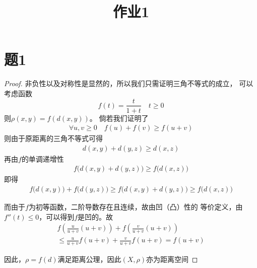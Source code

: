 \documentclass[cn]{homework}
\title{作业1}
\begin{document}
    \maketitle
    \section{题1}
    \begin{proof}
        非负性以及对称性是显然的，所以我们只需证明三角不等式的成立，
        可以考虑函数
        \[f(t)=\frac{t}{1+t}\quad t\geq 0\]
        则$\rho(x,y)=f(d(x,y))$。
        倘若我们证明了
        \begin{align*}
            \forall u,v\geq 0\quad
            f(u)+f(v)\geq f(u+v)
        \end{align*}
        则由于原距离的三角不等式可得
        \begin{align*}
            d(x,y)+d(y,z)\geq d(x,z)
        \end{align*}
        再由$f$的单调递增性
        \begin{align*}
            f\big(d(x,y)+d(y,z)\big)\geq f\big(d(x,z)\big)
        \end{align*}
        即得
        \begin{align*}
            f\big(d(x,y)\big)+f\big(d(y,z)\big)
            \geq f\big(d(x,y)+d(y,z)\big)
            \geq f\big(d(x,z)\big)
        \end{align*}

        而由于$f$为初等函数，二阶导数存在且连续，故由凹（凸）性的
        等价定义，由$f''(t)\leq 0$，可以得到$f$是凹的。故
        \begin{multline*}
            f\left(\frac{u}{u+v}(u+v)\right)+f\left(\frac{v}{u+v}(u+v)\right)\\
            \leq\frac{u}{u+v}f(u+v)+\frac{v}{u+v}f(u+v)
            =f(u+v)
        \end{multline*}
        
        因此，$\rho=f(d)$满足距离公理，因此$(X,\rho)$亦为距离空间
    \end{proof}
\end{document}
